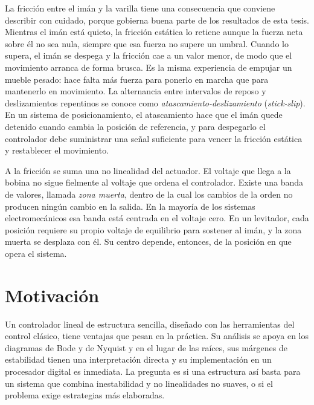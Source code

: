 La fricción entre el imán y la varilla tiene una consecuencia que conviene describir con cuidado, porque gobierna buena parte de los resultados de esta tesis. Mientras el imán está quieto, la fricción estática lo retiene aunque la fuerza neta sobre él no sea nula, siempre que esa fuerza no supere un umbral. Cuando lo supera, el imán se despega y la fricción cae a un valor menor, de modo que el movimiento arranca de forma brusca. Es la misma experiencia de empujar un mueble pesado: hace falta más fuerza para ponerlo en marcha que para mantenerlo en movimiento. La alternancia entre intervalos de reposo y deslizamientos repentinos se conoce como \emph{atascamiento-deslizamiento} (\emph{stick-slip}). En un sistema de posicionamiento, el atascamiento hace que el imán quede detenido cuando cambia la posición de referencia, y para despegarlo el controlador debe suministrar una señal suficiente para vencer la fricción estática y restablecer el movimiento.

A la fricción se suma una no linealidad del actuador. El voltaje que llega a la bobina no sigue fielmente al voltaje que ordena el controlador. Existe una banda de valores, llamada \emph{zona muerta}, dentro de la cual los cambios de la orden no producen ningún cambio en la salida. En la mayoría de los sistemas electromecánicos esa banda está centrada en el voltaje cero. En un levitador, cada posición requiere su propio voltaje de equilibrio para sostener al imán, y la zona muerta se desplaza con él. Su centro depende, entonces, de la posición en que opera el sistema.

\section{Motivación}\label{sec:motivacion}

Un controlador lineal de estructura sencilla, diseñado con las herramientas del control clásico, tiene ventajas que pesan en la práctica. Su análisis se apoya en los diagramas de Bode y de Nyquist y en el lugar de las raíces, sus márgenes de estabilidad tienen una interpretación directa y su implementación en un procesador digital es inmediata. La pregunta es si una estructura así basta para un sistema que combina inestabilidad y no linealidades no suaves, o si el problema exige estrategias más elaboradas.


